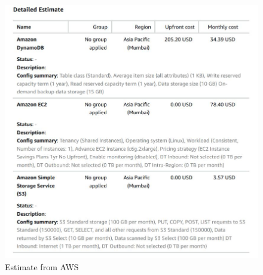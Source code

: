 \documentclass[11pt]{article}
\begin{document}
\begin{figure}[H]
    \centering
    \includegraphics[width=.95\textwidth]{aws estimate.jpg}
    \caption{Estimate from AWS}
\end{figure}
\end{document}
